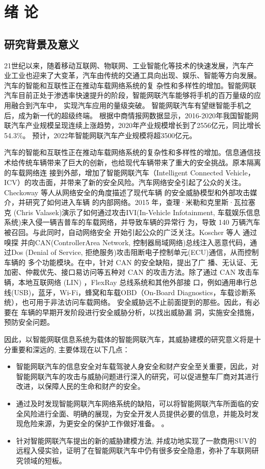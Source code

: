 \chapter{绪\hskip 0.4cm 论}
\label{ch1}
\section{研究背景及意义}
21世纪以来，随着移动互联网、物联网、工业智能化等技术的快速发展，汽车产
业工业也迎来了大变革，汽车由传统的交通工具向出现、娱乐、智能等方向发展。汽车的智能和互联性正在推动车载网络系统的复
杂性和多样性的增加。智能网联汽车目前正处于渗透率快速提升的阶段，智能网联汽车能够将手机的百万量级的应用融合到汽车中，
实现汽车应用的量级突破。
智能网联汽车有望继智能手机之后，成为新一代的超级终端。
根据中商情报网数据显示\cite{zhao}，2016-2020年我国智能网联汽车产业规模呈现连续上涨趋势，2020年产业规模增长到了2556亿元，同比增长54.3\%。
预计，2022年智能网联汽车产业规模将超3500亿元。

汽车的智能和互联性正在推动车载网络系统的复杂性和多样性的增加。信息通信技术给传统车辆带来了巨大的创新，也给现代车辆带来了重大的安全挑战。原本隔离的车载网络连
接到外部，增加了智能网联汽车（Intelligent Connected Vehicle，ICV）的攻击面，并带来了新的安全风险。汽车网络安全引起了公众的关注。
Checkoway 等人\cite{checkoway2011comprehensive}从网络安全的角度描述了现代车辆
的安全威胁模型和外部攻击媒介，并研究了如何进入车辆
的内部网络。2015 年，查理·米勒和克里斯·瓦拉塞克
(Chris Valasek)演示了如何通过攻击IVI(In-Vehicle Infotainment, 车载娱乐信息系统)来入侵一辆吉普车的车载网络，并导致车辆的异常行
为，导致 140 万辆汽车被召回。与此同时，自动网络安全
开始引起公众的广泛关注\cite{miller2015remote}。Koscher 等人 \cite{koscher2010experimental} 通过嗅探
并向CAN(ControllerArea Network, 控制器局域网络)总线注入恶意代码，通过Dos
(Denial of Service, 拒绝服务)攻击阻断电子控制单元(ECU)通信，从而控制车辆的
多个功能模块。在\cite{liu2017vehicle}中，针对 CAN 的安全缺陷，提出了广
播、无认证、无加密、仲裁优先、接口易访问等五种对
CAN 的攻击方法。除了通过 CAN 攻击车辆，本地互联网络
(LIN) \cite{deng2017security}，FlexRay \cite{takahashi2017automotive} \cite{gu2016security} 总线系统和其他外部接
口，例如通用串行总线(USB)，蓝牙，Wi-Fi，蜂窝和车载OBD（On-Board Diagnostics，车载诊断系统），也可用于非法访问车载网络\cite{mousa2016lightweight}。
安全威胁远不止前面提到的那些。因此，有必要在
车辆的早期开发阶段进行安全威胁分析，以找出威胁漏
洞，实施安全措施，预防安全问题。

因此，以智能网联信息系统为载体的智能网联汽车，其威胁建模的研究意义将是十分重要和深远的, 主要体现在以下几点：
\begin{itemize}
  \item 智能网联汽车的信息安全对车载驾驶人身安全和财产安全至关重要，因此，对智能网联汽车的攻击与威胁问题进行深入的研究，可以促进整车厂商对其进行改进，以保障人民的生命和财产的安全。
  \item 通过及时发现智能网联汽车网络系统的缺陷，可以将智能网联汽车所面临的安全风险进行全面、明确的展现，为安全开发人员提供必要的信息，并能及时发现危险来源，为更安全的保护工作做好准备。  。
  \item 针对智能网联汽车提出的新的威胁建模方法, 并成功地实现了一款商用SUV的远程入侵实验，证明了在智能网联汽车中仍有很多安全隐患，弥补了车联网研究领域的短板。  
\end{itemize}
